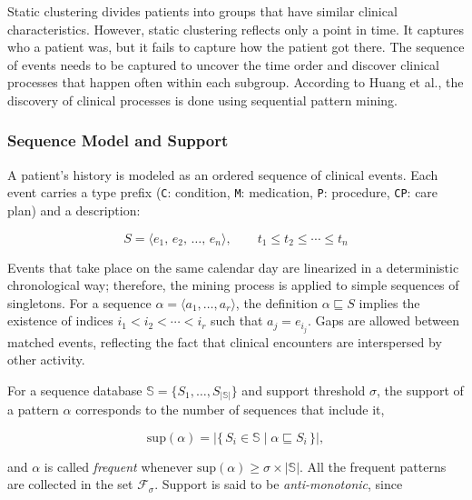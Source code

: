 Static clustering divides patients into groups that have similar clinical characteristics. However, static clustering reflects only a point in time. It captures who a patient was, but it fails to capture how the patient got there. The sequence of events needs to be captured to uncover the time order and discover clinical processes that happen often within each subgroup. According to Huang et al.\cite{huang2014}, the discovery of clinical processes is done using sequential pattern mining.

\subsubsection*{Sequence Model and Support}

A patient's history is modeled as an ordered sequence of clinical events. Each event carries a type prefix (\texttt{C}: condition, \texttt{M}: medication, \texttt{P}: procedure, \texttt{CP}: care plan) and a description:

\begin{equation}
    S = \langle e_1,\, e_2,\, \ldots,\, e_n \rangle, \qquad t_1 \leq t_2 \leq \cdots \leq t_n
    \label{eq:sequence}
\end{equation}

Events that take place on the same calendar day are linearized in a deterministic chronological way; therefore, the mining process is applied to simple sequences of singletons. For a sequence $\alpha = \langle a_1, \ldots, a_r \rangle$, the definition $\alpha \sqsubseteq S$ implies the existence of indices $i_1 < i_2 < \cdots < i_r$ such that $a_j = e_{i_j}$. Gaps are allowed between matched events, reflecting the fact that clinical encounters are interspersed by other activity.

For a sequence database $\mathbb{S} = \{S_1, \ldots, S_{|\mathbb{S}|}\}$ and support threshold $\sigma$, the support of a pattern $\alpha$ corresponds to the number of sequences that include it,

\begin{equation}
    \mathrm{sup}(\alpha) = \bigl|\{\, S_i \in \mathbb{S} \mid \alpha \sqsubseteq S_i \,\}\bigr|,
    \label{eq:support}
\end{equation}

and $\alpha$ is called \emph{frequent} whenever $\mathrm{sup}(\alpha) \geq \sigma \times |\mathbb{S}|$. All the frequent patterns are collected in the set $\mathcal{F}_\sigma$. Support is said to be \emph{anti-monotonic}, since

